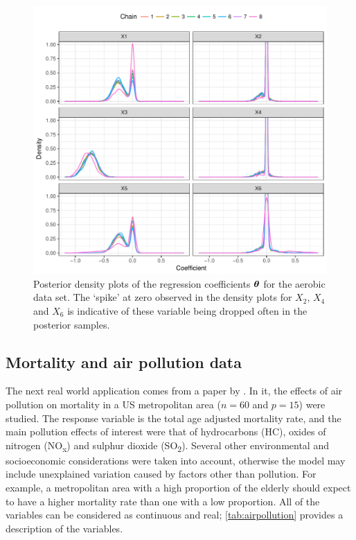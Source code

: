 \documentclass[showframe,11pt,twoside,openright]{report}
\begin{document}
\begin{figure}[H]
  \centering
  \includegraphics[width=\textwidth]{figure/06-aerobic_coef}
  \caption[Posterior density plots of the regression coefficients for the aerobic data set.]{Posterior density plots of the regression coefficients ${\bm\theta}$ for the aerobic data set. The `spike' at zero observed in the density plots for $X_2$, $X_4$ and $X_6$ is indicative of these variable being dropped often in the posterior samples.}
  \label{fig:aerobic-densplot}
\end{figure}

\subsection{Mortality and air pollution data}
\label{sec:airpollution}

The next real world application comes from a paper by \citet{McDonald1973}. 
In it, the effects of air pollution on mortality in a US metropolitan area ($n=60$ and $p=15$) were studied. 
The response variable is the total age adjusted mortality rate, and the main pollution effects of interest were that of hydrocarbons (HC), oxides of nitrogen (NO\textsubscript{x}) and sulphur dioxide (SO\textsubscript{2}). 
Several other environmental and socioeconomic considerations were taken into account, otherwise the model may include unexplained variation caused by factors other than pollution. 
For example, a metropolitan area with a high proportion of the elderly should expect to have a higher mortality rate than one with a low proportion. 
All of the variables can be considered as continuous and real; \cref{tab:airpollution} provides a description of the variables.
\end{document}
